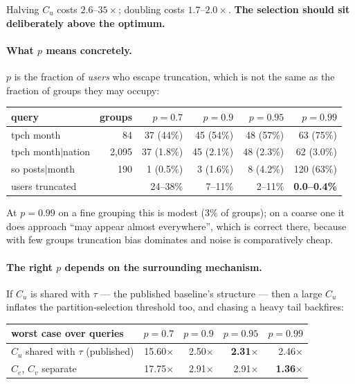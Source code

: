 \documentclass[11pt,a4paper]{article}
\newcommand{\Cu}{C_u}
\newcommand{\Cv}{C_v}
\newcommand{\Ce}{C_e}
\begin{document}
Halving $\Cu$ costs $2.6$--$35\times$; doubling costs $1.7$--$2.0\times$. \textbf{The selection
should sit deliberately above the optimum.}

\paragraph{What $p$ means concretely.} $p$ is the fraction of \emph{users} who escape truncation,
which is not the same as the fraction of groups they may occupy:

\begin{center}\small
\begin{tabular}{lrrrrr}
\toprule
query & groups & $p{=}0.7$ & $p{=}0.9$ & $p{=}0.95$ & $p{=}0.99$ \\
\midrule
tpch month          &    84 & 37 (44\%) & 45 (54\%) & 48 (57\%) & 63 (75\%) \\
tpch month$|$nation & 2,095 & 37 (1.8\%) & 45 (2.1\%) & 48 (2.3\%) & 62 (3.0\%) \\
so posts$|$month    &   190 & 1 (0.5\%) & 3 (1.6\%) & 8 (4.2\%) & 120 (63\%) \\
\midrule
users truncated     &       & 24--38\% & 7--11\% & 2--11\% & \textbf{0.0--0.4\%} \\
\bottomrule
\end{tabular}
\end{center}

At $p = 0.99$ on a fine grouping this is modest ($3\%$ of groups); on a coarse one it does approach
``may appear almost everywhere'', which is correct there, because with few groups truncation bias
dominates and noise is comparatively cheap.

\paragraph{The right $p$ depends on the surrounding mechanism.} If $\Cu$ is shared with $\tau$ ---
the published baseline's structure --- then a large $\Cu$ inflates the partition-selection threshold
too, and chasing a heavy tail backfires:

\begin{center}\small
\begin{tabular}{lrrrr}
\toprule
worst case over queries & $p{=}0.7$ & $p{=}0.9$ & $p{=}0.95$ & $p{=}0.99$ \\
\midrule
$\Cu$ shared with $\tau$ (published) & 15.60$\times$ & 2.50$\times$ & \textbf{2.31$\times$} & 2.46$\times$ \\
$\Ce$, $\Cv$ separate & 17.75$\times$ & 2.91$\times$ & 2.91$\times$ & \textbf{1.36$\times$} \\
\bottomrule
\end{tabular}
\end{center}
\end{document}
